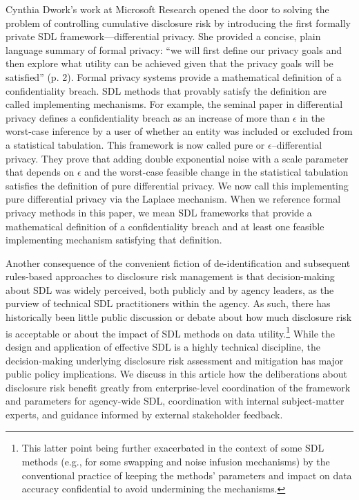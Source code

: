 Cynthia Dwork's work at Microsoft Research \cite{dwork:2006:10.1007/11787006_1} opened the door to solving the problem of controlling cumulative disclosure risk by introducing the first formally private SDL framework---differential privacy. She provided a concise, plain language summary of formal privacy: ``we will first define our privacy goals and then explore what utility can be achieved given that the privacy goals will be satisfied'' (p. 2). Formal privacy systems provide a mathematical definition of a confidentiality breach. SDL methods that provably satisfy the definition are called implementing mechanisms. For example, the seminal paper in differential privacy \cite{dwork:et:al:2006:10.1007/11681878_14} defines a confidentiality breach as an increase of more than $\epsilon$ in the worst-case inference by a user of whether an entity was included or excluded from a statistical tabulation. This framework is now called pure or $\epsilon$--differential privacy. They prove that adding double exponential noise with a scale parameter that depends on $\epsilon$ and the worst-case feasible change in the statistical tabulation satisfies the definition of pure differential privacy. We now call this implementing pure differential privacy via the Laplace mechanism. When we reference formal privacy methods in this paper, we mean SDL frameworks that provide a mathematical definition of a confidentiality breach and at least one feasible implementing mechanism satisfying that definition.

Another consequence of the convenient fiction of de-identification and subsequent rules-based approaches to disclosure risk management is that decision-making about SDL was widely perceived, both publicly and by agency leaders, as the purview of technical SDL practitioners within the agency. As such, there has historically been little public discussion or debate about how much disclosure risk is acceptable or about the impact of SDL methods on data utility.\footnote{This latter point being further exacerbated in the context of some SDL methods (e.g., for some swapping and noise infusion mechanisms) by the conventional practice of keeping the methods' parameters and impact on data accuracy confidential to avoid undermining the mechanisms.} While the design and application of effective SDL is a highly technical discipline, the decision-making underlying disclosure risk assessment and mitigation has major public policy implications. We discuss in this article how the deliberations about disclosure risk benefit greatly from enterprise-level coordination of the framework and parameters for agency-wide SDL, coordination with internal subject-matter experts, and guidance informed by external stakeholder feedback.

